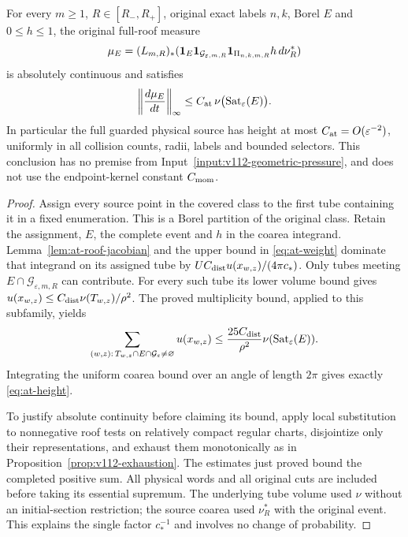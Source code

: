 \begin{theorem}
\label{thm:at-height}
For every $m\ge1$, $R\in[R_-,R_+]$, original exact labels $n,k$,
Borel $E$ and $0\le h\le1$, the original full-roof measure
\[
 \mu_E=(L_{m,R})_*
  (\mathbf1_E\mathbf1_{\mathcal G_{\varepsilon,m,R}}
                         \mathbf1_{\Pi_{n,k,m,R}}h\,d\nu_R^*)
\]
is absolutely continuous and satisfies
\begin{equation}\label{eq:at-height}
 \left\|\frac{d\mu_E}{dt}\right\|_\infty
 \le C_{\rm at}\,
       \nu\bigl(\operatorname{Sat}_\varepsilon(E)\bigr).
\end{equation}
In particular the full guarded physical source has height at most
$C_{\rm at}=O(\varepsilon^{-2})$, uniformly in all collision
counts, radii, labels and bounded selectors.  This conclusion has
no premise from Input~\ref{input:v112-geometric-pressure}, and
does not use the endpoint-kernel constant $C_{\rm mom}$.
\end{theorem}
\begin{proof}
Assign every source point in the covered class to the first tube
containing it in a fixed enumeration.  This is a Borel partition
of the original class.  Retain the assignment, $E$, the complete
event and $h$ in the coarea integrand.  Lemma~\ref{lem:at-roof-jacobian}
and the upper bound in \eqref{eq:at-weight} dominate that
integrand on its assigned tube by
$U C_{\rm dist}u(x_{w,z})/(4\pi c_*)$.
Only tubes meeting $E\cap\mathcal G_{\varepsilon,m,R}$ can
contribute.  For every such tube its lower volume bound gives
$u(x_{w,z})\le C_{\rm dist}\nu(T_{w,z})/\rho^2$.
The proved multiplicity bound, applied to this subfamily, yields
\[
 \sum_{(w,z):\,T_{w,z}\cap E\cap\mathcal G_\varepsilon\ne\varnothing}
 u(x_{w,z})
 \le\frac{25C_{\rm dist}}{\rho^2}
             \nu(\operatorname{Sat}_\varepsilon(E)).
\]
Integrating the uniform coarea bound over an angle of length
$2\pi$ gives exactly \eqref{eq:at-height}.

To justify absolute continuity before claiming its bound, apply
local substitution to nonnegative roof tests on relatively
compact regular charts, disjointize only their representations,
and exhaust them monotonically as in
Proposition~\ref{prop:v112-exhaustion}.  The estimates just
proved bound the completed positive sum.  All physical words
and all original cuts are included before taking its essential
supremum.  The underlying tube volume used $\nu$ without an
initial-section restriction; the source coarea used $\nu_R^*$
with the original event.  This explains the single factor
$c_*^{-1}$ and involves no change of probability.
\end{proof}

